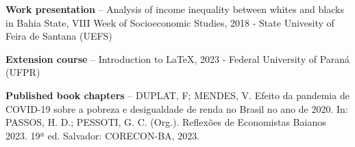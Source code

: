 \documentclass[10pt,a4paper]{cv}
\begin{document}


\divider


\divider





\textbf{Work presentation} -- Analysis of income inequality between whites and blacks in Bahia State, VIII Week of Socioeconomic Studies, 2018 - State Univesity of Feira de Santana (UEFS)

\textbf{Extension course} -- Introduction to \LaTeX{}, 2023 - Federal University of Paraná (UFPR)

\textbf{Published book chapters} -- DUPLAT, F; MENDES, V. Efeito da pandemia de COVID-19 sobre a pobreza e desigualdade de renda no Brasil no ano de 2020. In: PASSOS, H. D.; PESSOTI, G. C. (Org.). Reflexões de Economistas Baianos 2023. 19ª ed. Salvador: CORECON-BA, 2023.








\end{document}
